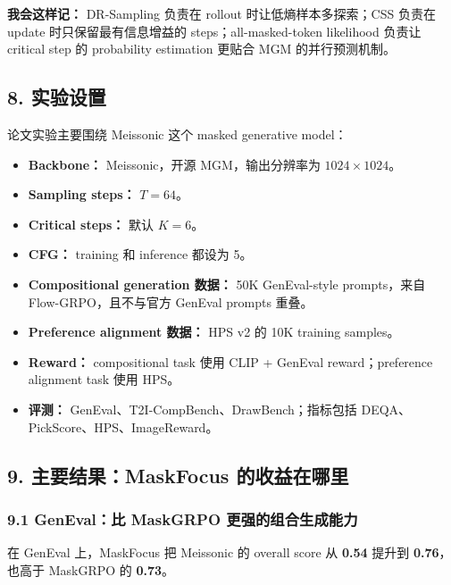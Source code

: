 \begin{intubox}
\textbf{我会这样记：} DR-Sampling 负责在 rollout 时让低熵样本多探索；CSS 负责在 update 时只保留最有信息增益的 steps；all-masked-token likelihood 负责让 critical step 的 probability estimation 更贴合 MGM 的并行预测机制。
\end{intubox}

\subsection{8. 实验设置}

论文实验主要围绕 Meissonic 这个 masked generative model：

\begin{itemize}[leftmargin=1.5em]
  \item \textbf{Backbone：} Meissonic，开源 MGM，输出分辨率为 \(1024\times1024\)。
  \item \textbf{Sampling steps：} \(T=64\)。
  \item \textbf{Critical steps：} 默认 \(K=6\)。
  \item \textbf{CFG：} training 和 inference 都设为 5。
  \item \textbf{Compositional generation 数据：} 50K GenEval-style prompts，来自 Flow-GRPO，且不与官方 GenEval prompts 重叠。
  \item \textbf{Preference alignment 数据：} HPS v2 的 10K training samples。
  \item \textbf{Reward：} compositional task 使用 CLIP + GenEval reward；preference alignment task 使用 HPS。
  \item \textbf{评测：} GenEval、T2I-CompBench、DrawBench；指标包括 DEQA、PickScore、HPS、ImageReward。
\end{itemize}

\subsection{9. 主要结果：MaskFocus 的收益在哪里}

\subsubsection{9.1 GenEval：比 MaskGRPO 更强的组合生成能力}

在 GenEval 上，MaskFocus 把 Meissonic 的 overall score 从 \textbf{0.54} 提升到 \textbf{0.76}，也高于 MaskGRPO 的 \textbf{0.73}。

